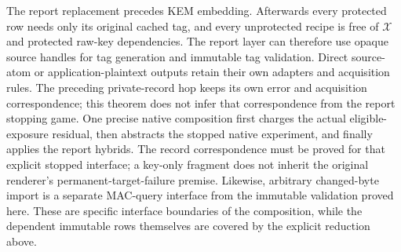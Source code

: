 The report replacement precedes KEM embedding.  Afterwards every protected
row needs only its original cached tag, and every unprotected recipe is free
of $\mathcal X$ and protected raw-key dependencies.  The report layer can
therefore use opaque source handles for tag generation and immutable tag
validation.  Direct source-atom or application-plaintext outputs retain their
own adapters and acquisition rules.  The preceding private-record hop keeps
its own error and acquisition correspondence; this theorem does not infer
that correspondence from the report stopping game.  One precise native
composition first charges the actual eligible-exposure residual, then
abstracts the stopped native experiment, and finally applies the report
hybrids.  The record correspondence must be proved for that explicit stopped
interface; a key-only fragment does not inherit the original renderer's
permanent-target-failure premise.  Likewise, arbitrary
changed-byte import is a separate MAC-query interface from the immutable
validation proved here.  These are specific interface boundaries of the
composition, while the dependent immutable rows themselves are covered by
the explicit reduction above.
